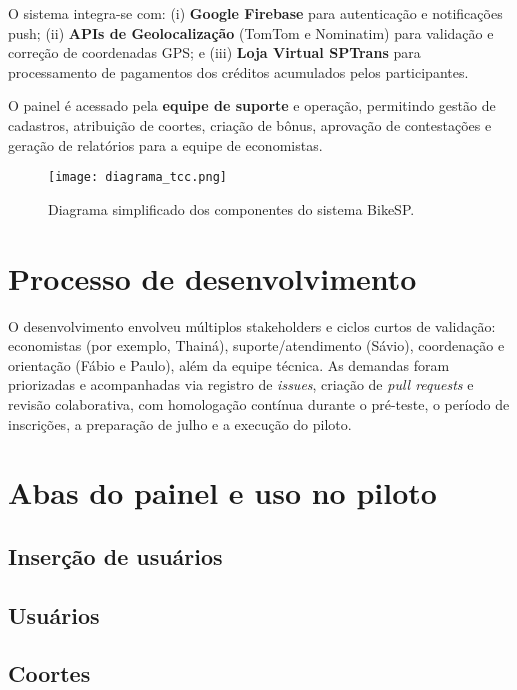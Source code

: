 O sistema integra-se com: (i) \textbf{Google
Firebase} para autenticação e notificações push; (ii) \textbf{APIs de
Geolocalização} (TomTom e Nominatim) para validação e correção de coordenadas
GPS; e (iii) \textbf{Loja Virtual SPTrans} para processamento de pagamentos dos
créditos acumulados pelos participantes.

O painel é acessado pela \textbf{equipe de suporte} e
operação, permitindo gestão de cadastros, atribuição de coortes, criação de
bônus, aprovação de contestações e geração de relatórios para a equipe de
economistas.

\begin{figure}[H]
  \centering
  \texttt{[image: diagrama\_tcc.png]}
  \caption{Diagrama simplificado dos componentes do sistema BikeSP.}
  \label{fig:arquitetura}
\end{figure}

\section{Processo de desenvolvimento}
\label{sec:processo-desenvolvimento}
O desenvolvimento envolveu múltiplos stakeholders e ciclos curtos de validação:
economistas (por exemplo, Thainá), suporte/atendimento (Sávio), coordenação e
orientação (Fábio e Paulo), além da equipe técnica. As demandas foram
priorizadas e acompanhadas via registro de \textit{issues}, criação de
\textit{pull requests} e revisão colaborativa, com homologação contínua durante
o pré-teste, o período de inscrições, a preparação de julho e a execução do
piloto.

\section{Abas do painel e uso no piloto}
\label{sec:abas-painel}

\subsection{Inserção de usuários}


\subsection{Usuários}



\subsection{Coortes}



